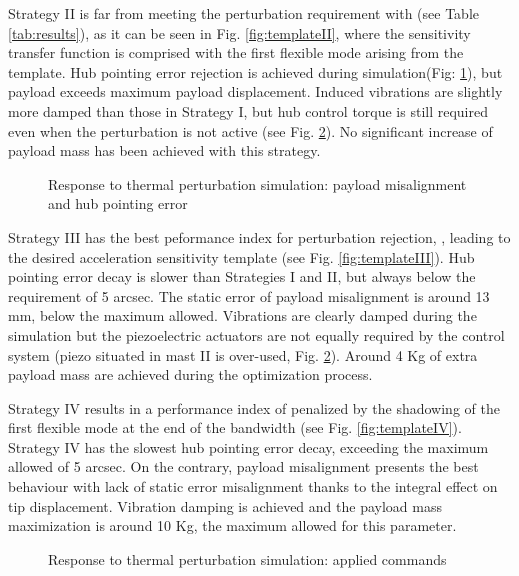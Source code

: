 \documentclass{ifacconf}
\begin{document}
Strategy II is far from meeting the perturbation requirement with  (see Table \ref{tab:results}), as it can be seen in Fig. \ref{fig:templateII}, where the sensitivity transfer function is comprised with the first flexible mode arising from the template. Hub pointing error rejection is achieved during simulation(Fig: \ref{fig:simulationPointing}), but payload exceeds maximum payload displacement. Induced vibrations are slightly more damped than those in Strategy I, but hub control torque is still required even when the perturbation is not active (see Fig. \ref{fig:simulationCommands}). No significant increase of payload mass has been achieved with this strategy.

\begin{figure}[]
\centering
{}
\hfill
{}
\caption{Response to thermal perturbation simulation: payload misalignment and hub pointing error}
\label{fig:simulationPointing}
\end{figure}

Strategy III has the best peformance index for perturbation rejection, , leading to the desired acceleration sensitivity template (see Fig. \ref{fig:templateIII}). Hub pointing error decay is slower than Strategies I and II, but always below the requirement of 5 arcsec. The static error of payload misalignment is  around 13 mm, below the maximum allowed. Vibrations are clearly damped during the simulation but the piezoelectric actuators are not equally required by the control system (piezo situated in mast II is over-used, Fig. \ref{fig:simulationCommands}). Around 4 Kg of extra payload mass are achieved during the optimization process. 

Strategy IV results in a performance index of  penalized by the shadowing of the first flexible mode at the end of the bandwidth (see Fig. \ref{fig:templateIV}). Strategy IV has the slowest hub pointing error decay, exceeding the maximum allowed of 5 arcsec. On the contrary, payload misalignment presents the best behaviour with lack of static error misalignment thanks to the integral effect on tip displacement. Vibration damping is achieved and the payload mass maximization is around 10 Kg, the maximum allowed for this parameter.


\begin{figure}[]
\centering
{}
\hfill
{} 
\hfill
{}
\caption{Response to thermal perturbation simulation: applied commands}
\label{fig:simulationCommands}
\end{figure}
\end{document}
